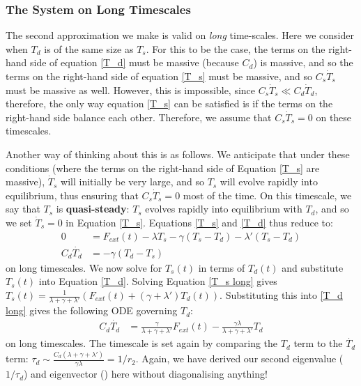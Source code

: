 \subsubsection{The System on Long Timescales}

The second approximation we make is valid on \textit{long} time-scales. Here we consider when $T_d$ is of the same size as $T_s$. For this to be the case, the terms on the right-hand side of equation \ref{T_d} must be massive (because $C_d$) is massive, and so the terms on the right-hand side of equation \ref{T_s} must be massive, and so $C_s \dot T_s$ must be massive as well. However, this is impossible, since $C_s \dot T_s \ll C_d \dot T_d$, therefore, the only way equation \ref{T_s} can be satisfied is if the terms on the right-hand side balance each other. Therefore, we assume that  $C_s \dot T_s=0$ on these timescales.

Another way of thinking about this is as follows. We anticipate that under these conditions (where the terms on the right-hand side of Equation \ref{T_s} are massive), $\dot T_s$ will initially be very large, and so $T_s$ will evolve rapidly into equilibrium, thus ensuring that $C_s \dot T_s=0$ most of the time. On this timescale, we say that $T_s$ is \textbf{quasi-steady}: $T_s$ evolves rapidly into equilibrium with $T_d$, and so we set $\dot T_s=0$ in Equation \ref{T_s}. Equations \ref{T_s} and \ref{T_d} thus reduce to:
\begin{align}
    0 & = F_{ext}(t)-\lambda T_s -\gamma (T_s-T_d) - \lambda'(T_s-T_d) \label{T_s long} \\ 
    C_d \dot{T_d} &= -\gamma (T_d-T_s) \label{T_d long}
\end{align}
on long timescales. We now solve for $T_s(t)$ in terms of $T_d(t)$ and substitute $T_s(t)$ into Equation \ref{T_d}. Solving Equation \ref{T_s long} gives $T_s(t)=\frac{1}{\lambda+\gamma+\lambda'}\left(F_{ext}(t)+(\gamma+\lambda ')T_d(t)\right)$. Substituting this into \ref{T_d long} gives the following ODE governing $T_d$:
\begin{align}
    C_d \dot{T_d} &= \frac{\gamma}{\lambda+\gamma+\lambda'}F_{ext}(t) - \frac{\gamma\lambda}{\lambda+\gamma+\lambda'}T_d\label{T_d long T_s} 
\end{align}
on long timescales. The timescale is set again by comparing the $T_d$ term to the $\dot{T_d}$ term: $\tau_d\sim \frac{C_d(\lambda+\gamma+\lambda')}{\gamma\lambda}=1/r_2$. Again, we have derived our second eigenvalue ($1/\tau_d$) and eigenvector () here without diagonalising anything!

